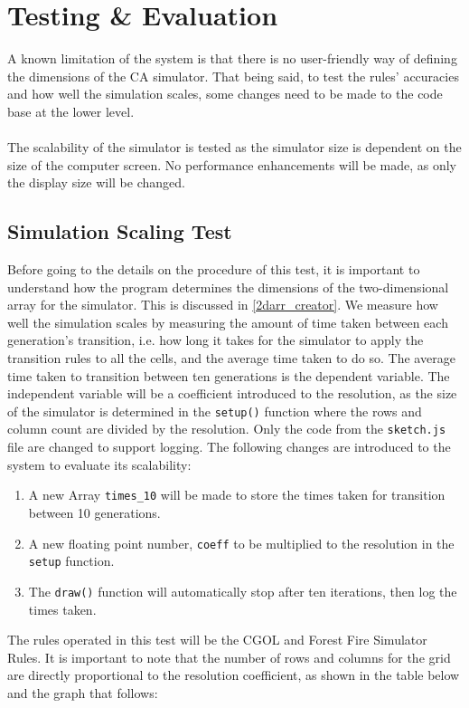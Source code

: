 \chapter{Testing \& Evaluation}

A known limitation of the system is that there is no user-friendly way of defining the dimensions of the CA simulator. That being said, to test the rules' accuracies and how well the simulation scales, some changes need to be made to the code base at the lower level. 
\\ \\
The scalability of the simulator is tested as the simulator size is dependent on the size of the computer screen. No performance enhancements will be made, as only the display size will be changed. 
\section{Simulation Scaling Test}
Before going to the details on the procedure of this test, it is important to understand how the program determines the dimensions of the two-dimensional array for the simulator. This is discussed in \ref{2darr_creator}.
We measure how well the simulation scales by measuring the amount of time taken between each generation's transition, i.e. how long it takes for the simulator to apply the transition rules to all the cells, and the average time taken to do so. The average time taken to transition between ten generations is the dependent variable. The independent variable will be a coefficient introduced to the resolution, as the size of the simulator is determined in the \texttt{setup()} function where the rows and column count are divided by the resolution. Only the code from the \texttt{sketch.js} file are changed to support logging. The following changes are introduced to the system to evaluate its scalability:
\begin{enumerate}
    \item A new Array \texttt{times\_10} will be made to store the times taken for transition between 10 generations.
    \item A new floating point number, \texttt{coeff} to be multiplied to the resolution in the \texttt{setup} function.
    \item The \texttt{draw()} function will automatically stop after ten iterations, then log the times taken. 
\end{enumerate}
The rules operated in this test will be the CGOL and Forest Fire Simulator Rules.
\newpage
\noindent It is important to note that the number of rows and columns for the grid are directly proportional to the resolution coefficient, as shown in the table below and the graph that follows:
